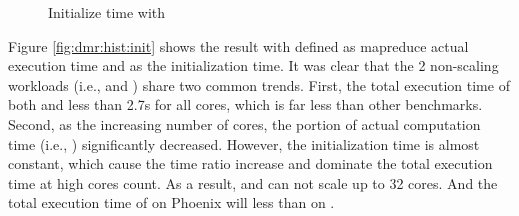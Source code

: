   
\begin{figure}[htpb]
	\centering
	\caption{Initialize time with \myds}
	\label{fig:init}
\end{figure}




Figure \ref{fig:dmr:hist:init} shows the result with  defined as mapreduce actual execution time and  as the initialization time. 
It was clear that the 2 non-scaling workloads (i.e.,  and ) share two common trends. 
First, the total execution time of both  and  less than 2.7s for all cores, which is far less than other benchmarks. 
Second, as the increasing number of cores, the portion of actual computation time (i.e., ) significantly decreased.
However, the initialization time is almost constant, which cause the  time ratio increase and dominate the total execution time at high cores count. 
As a result,   and  can not scale up to 32 cores.
And the total execution time of  on Phoenix will less than on \myds.





